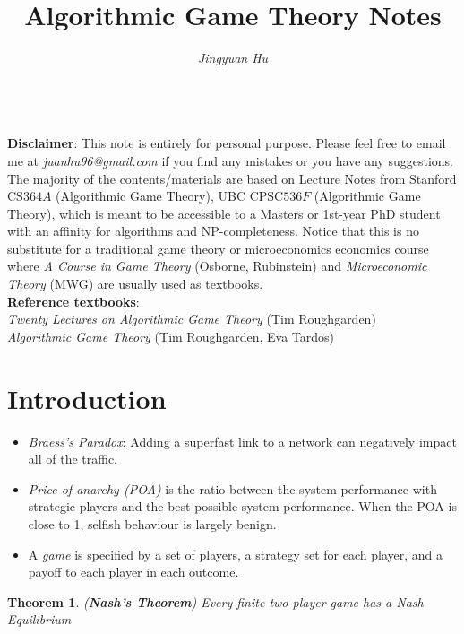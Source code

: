 \documentclass[10pt]{article}
\newtheorem{thm}{Theorem}[section]
\theoremstyle{definition}
\begin{document}
\title{\vspace{-1.6cm} \huge\textbf{{Algorithmic Game Theory Notes}}}
\author{\large\textit{{Jingyuan Hu}}}
\date{}
\maketitle
\text{}\\
\textbf{Disclaimer}: This note is entirely for personal purpose.
Please feel free to email me at \textit{juanhu96@gmail.com} if you find any mistakes or you have any suggestions.
The majority of the contents/materials are based on Lecture Notes from Stanford CS$364A$ (Algorithmic Game Theory),
UBC CPSC$536F$ (Algorithmic Game Theory), which is meant to be accessible to a Masters or 1st-year
PhD student with an affinity for algorithms and NP-completeness. Notice that this is no substitute for a traditional game theory or
microeconomics economics course where \textit{A Course in Game Theory} (Osborne, Rubinstein) and \textit{Microeconomic Theory} (MWG)
are usually used as textbooks.\\
\textbf{Reference textbooks}:\\
\textit{Twenty Lectures on Algorithmic Game Theory} (Tim Roughgarden)\\
\textit{Algorithmic Game Theory} (Tim Roughgarden, Eva Tardos)\\

\tableofcontents

\section{Introduction}

\begin{itemize}
	\item \textit{Braess's Paradox}: Adding a superfast link to a network can negatively impact all of the traffic.
	\item \textit{Price of anarchy (POA)} is the ratio between the system performance with strategic players and
	      the best possible system performance. When the POA is close to 1, selfish behaviour is largely benign.
	\item A \textit{game} is specified by a set of players, a strategy set for each player, and a payoff to each player in each outcome.
\end{itemize}


\begin{thm} (\textbf{Nash's Theorem})
	Every finite two-player game has a Nash Equilibrium
\end{thm}
\end{document}
